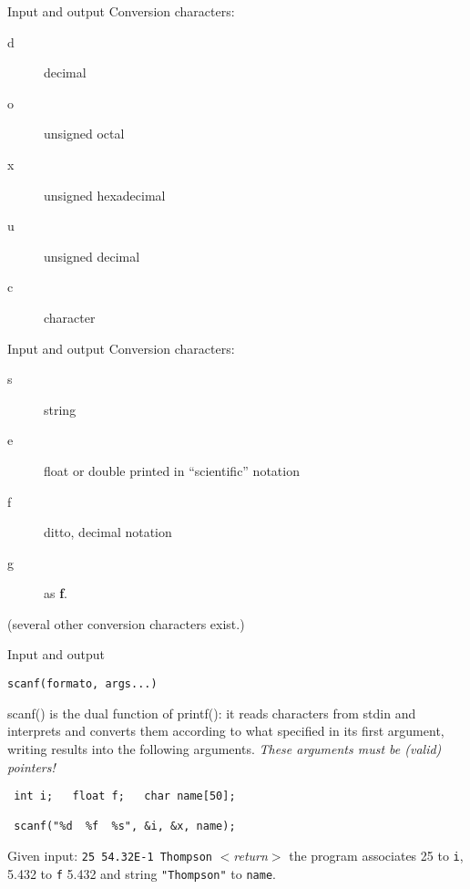 \begin{frame}[fragile]{Input and output}
Conversion characters:
\begin{description}
\item[d] decimal
\item[o] unsigned octal
\item[x] unsigned hexadecimal
\item[u] unsigned decimal
\item[c] character
\end{description}

\end{frame}
\begin{frame}[fragile]{Input and output}
Conversion characters:
\begin{description}
\item[s] string
\item[e] float or double printed in ``scientific'' notation
\item[f] ditto, decimal notation
\item[g] as {\bf f}.
\end{description}


\vspace{20pt}

(several other conversion characters exist.)

\end{frame}
\begin{frame}[fragile]{Input and output}
\begin{center}\tt scanf(formato, args...)\end{center}
scanf() is the dual function of printf(): it reads characters from stdin
and interprets and converts them according to what specified in
its first argument, writing results into the following
arguments.
{\em These arguments must be (valid) pointers!}


\vspace{20pt}

\begin{tt}
\begin{verbatim}
 int i;   float f;   char name[50];

 scanf("%d  %f  %s", &i, &x, name);
\end{verbatim}
\end{tt}


\vspace{20pt}

Given input: {\tt 25  54.32E-1 Thompson} {\em $<$return$>$\/}
the program associates 25 to {\tt i}, 5.432 to {\tt f} 5.432
and string {\tt "Thompson"} to {\tt name}.






\end{frame}
